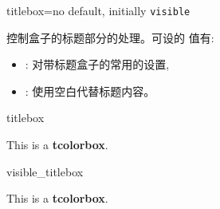 \begin{docTcbKey}[][doc new=2019-03-01]{titlebox}{=}{no default, initially \texttt{visible}}

控制盒子的标题部分的处理。可设的  值有:
  \begin{itemize}
  \item{}: %
  对带标题盒子的常用的设置,
  \item{}: %
使用空白代替标题内容。
  \end{itemize}
\begin{exdispExample}{titlebox}
\begin{tcolorbox}[title=My invisible title,
  titlebox=invisible]
This is a \textbf{tcolorbox}.
\end{tcolorbox}
\end{exdispExample}

\begin{exdispExample}{visible_titlebox}
  \begin{tcolorbox}[title=My visible title,
    titlebox=visible]
  This is a \textbf{tcolorbox}.
  \end{tcolorbox}
  \end{exdispExample}
\end{docTcbKey}



